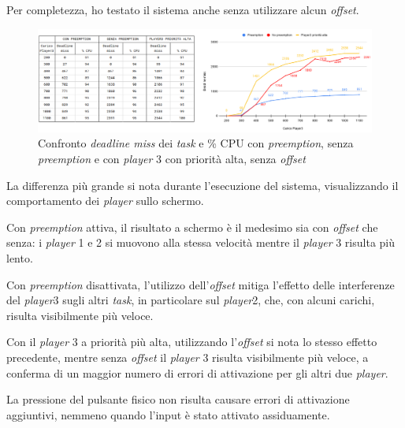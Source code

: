\documentclass{article}
\begin{document}
Per completezza, ho testato il sistema anche senza utilizzare alcun \textit{offset}.
\begin{figure}[H]
	\centering
	\includegraphics[width=7in]{image/CARICO-AUTOSTART.png}
	\caption{Confronto \textit{deadline miss} dei \textit{task} e \% CPU con \textit{preemption}, senza \textit{preemption} e con \textit{player} 3 con priorità alta, senza \textit{offset}}
	\label{siC-noO}
\end{figure}
La differenza più grande si nota durante l'esecuzione del sistema, visualizzando il comportamento dei \textit{player} sullo schermo. 

Con \textit{preemption} attiva, il risultato a schermo è il medesimo sia con \textit{offset} che senza: i \textit{player} 1 e 2 si muovono alla stessa velocità mentre il \textit{player} 3 risulta più lento.

Con \textit{preemption} disattivata, l'utilizzo dell'\textit{offset} mitiga l'effetto delle interferenze del \textit{player}3 sugli altri \textit{task}, in particolare sul \textit{player}2, che, con alcuni carichi, risulta visibilmente più veloce.

Con il \textit{player} 3 a priorità più alta, utilizzando l'\textit{offset} si nota lo stesso effetto precedente, mentre senza \textit{offset} il \textit{player} 3 risulta visibilmente più veloce, a conferma di un maggior numero di errori di attivazione per gli altri due \textit{player}.

La pressione del pulsante fisico non risulta causare errori di attivazione aggiuntivi, nemmeno quando l'input è stato attivato assiduamente.
\end{document}
